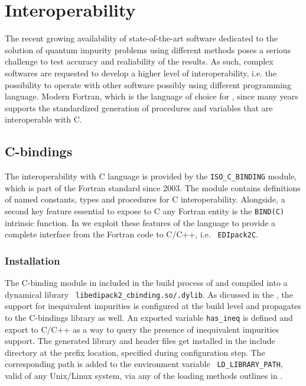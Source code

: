 \documentclass[edipack2.tex]{subfiles}
\begin{document}
\section{Interoperability}\label{SecInterop}
The recent growing availability of state-of-the-art software dedicated
to the solution of quantum impurity problems using different methods
poses a serious challenge to test accuracy and realiability of the
results.
As such, complex softwares are requested to develop a higher level of
interoperability, i.e. the possibility to operate with other software
possibly using different programming language.
Modern Fortran, which is the language of choice for \NAME, since many
years supports the standardized generation of procedures and
variables that are interoperable with C.


\subsection{C-bindings}\label{sSecInteropCbindings}
The interoperability with C language is provided by the
{\tt ISO\_C\_BINDING} module, which is part of the Fortran
standard since 2003. The module contains definitions of named
constants, types and procedures for C interoperability.
Alongside, a second key feature essential to expose to C any Fortran
entity is the {\tt BIND(C)} intrinsic function.
In \NAME we exploit these features of the language to provide a
complete interface from the Fortran code to C/C++, i.e. {\tt
  EDIpack2C}. 


\subsubsection{Installation}\label{sSecInteropCbindingsInstallation}
The C-binding module in included in the build process of \NAME and
compiled into a dynamical library {\tt
  libedipack2\_cbinding.so/.dylib}. As dicussed in the
, the support for inequivalent
impurities is configured at the build level and propagates to the
C-bindings library as well. An exported variable {\tt has\_ineq} is
defined and export to C/C++ as a way to query the presence of
inequivalent impurities support. 
The generated library and header files get installed in the include
directory at the prefix location, specified during configuration
step. The corresponding path is added to the environment variable {\tt
  LD\_LIBRARY\_PATH}, valid of any Unix/Linux system, via any of the
loading methods outlines in . 
\end{document}
